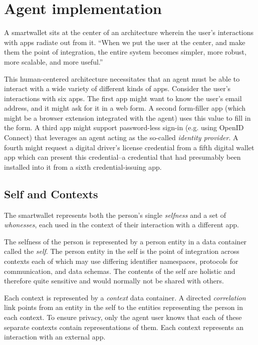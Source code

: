 \documentclass[11pt, oneside]{article}   	%
\begin{document}
\section{Agent implementation} %

A smartwallet sits at the center of an architecture wherein the user's interactions with apps radiate out from it. ``When we put the user at the center, and make them the point of integration, the entire system becomes simpler, more robust, more scalable, and more useful.''\cite{Andrieu2007}

This human-centered architecture necessitates that an agent must be able to interact with a wide variety of different kinds of apps. Consider the user's interactions with six apps. The first app might want to know the user's email address, and it might ask for it in a web form. A second form-filler app (which might be a browser extension integrated with the agent) uses this value to fill in the form. A third app might support password-less sign-in (e.g. using OpenID Connect) that leverages an agent acting as the so-called \emph{identity provider}. A fourth might request a digital driver's license credential from a fifth digital wallet app which can present this credential--a credential that had presumably been installed into it from a sixth credential-issuing app. 

\subsection{Self and Contexts}

The smartwallet represents both the person's single \emph{selfness} and a set of \emph{whonesses}, each used in the context of their interaction with a different app.

The selfness of the person is represented by a person entity in a data container called the \emph{self}. The person entity in the self is the point of integration across contexts each of which may use differing identifier namespaces, protocols for communication, and data schemas. The contents of the self are holistic and therefore quite sensitive and would normally not be shared with others. 

Each context is represented by a \emph{context} data container. A directed \emph{correlation} link points from an entity in the self to the entities representing the person in each context. To ensure privacy, only the agent user knows that each of these separate contexts contain representations of them. Each context represents an interaction with an external app. 
\end{document}
